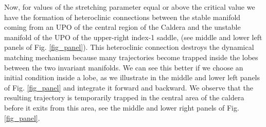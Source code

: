 \documentclass[a4paper,10pt]{article}
\begin{document}
Now, for values of the stretching parameter equal or above the critical value we have the formation of heteroclinic connections between  the stable manifold coming from an UPO of the central region of the Caldera and the unstable manifold of the UPO of the upper-right index-1 saddle, (see  middle and lower left panels of Fig. \ref{fig_panel}). This heteroclinic connection destroys the dynamical matching mechanism because many trajectories become trapped inside the lobes between the two invariant manifolds. We can see this better if we choose an initial condition inside a lobe, as we illustrate in the middle and lower left panels of Fig. \ref{fig_panel} and integrate it forward and backward. We observe that the resulting trajectory is temporarily trapped in the central area of the caldera before it exits from this area, see the middle and lower right panels of Fig. \ref{fig_panel}. 
\end{document}
